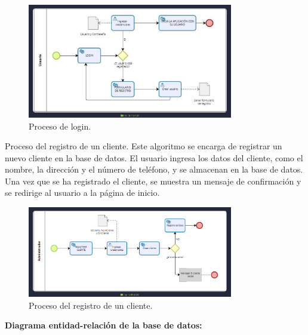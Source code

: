 \documentclass{article}
\begin{document}
\begin{figure}[H]
  \centering
  \includegraphics[width=0.8\textwidth]{./assets/p-login.png}
  \caption{Proceso de login.}
\end{figure}

\newpage

Proceso del registro de un cliente. Este algoritmo se encarga de registrar un nuevo cliente en la base de datos. El usuario ingresa los datos del cliente, como el nombre, la dirección y el número de teléfono, y se almacenan en la base de datos. Una vez que se ha registrado el cliente, se muestra un mensaje de confirmación y se redirige al usuario a la página de inicio.

\begin{figure}[H]
  \centering
  \includegraphics[width=0.8\textwidth]{./assets/p-clientes.png}
  \caption{Proceso del registro de un cliente.}
\end{figure}

\newpage

\textbf{\large{Diagrama entidad-relación de la base de datos:}}
\end{document}
